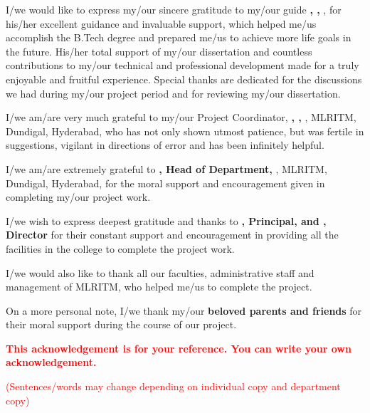 \begin{acknowledgment}
    I/we would like to express my/our sincere gratitude to my/our guide 
    \textbf{\guide, \guideDesignation, \deptName}, for his/her excellent guidance and invaluable support, which helped me/us accomplish the B.Tech degree and prepared me/us to achieve more life goals in the future. His/her total support of my/our dissertation and countless contributions to my/our technical and professional development made for a truly enjoyable and fruitful experience. Special thanks are dedicated for the discussions we had during my/our project period and for reviewing my/our dissertation.
    
    I/we am/are very much grateful to my/our Project Coordinator, 
    \textbf{\supervisor, \supervisorDesignation, \deptName}, MLRITM, Dundigal, Hyderabad, who has not only shown utmost patience, but was fertile in suggestions, vigilant in directions of error and has been infinitely helpful.
    
    I/we am/are extremely grateful to 
    \textbf{\hod, Head of Department, \deptName}, MLRITM, Dundigal, Hyderabad, for the moral support and encouragement given in completing my/our project work.
    
    I/we wish to express deepest gratitude and thanks to 
    \textbf{\principal, Principal, and \director, Director} for their constant support and encouragement in providing all the facilities in the college to complete the project work.
    
    I/we would also like to thank all our faculties, administrative staff and management of MLRITM, who helped me/us to complete the project.
    
    On a more personal note, I/we thank my/our \textbf{beloved parents and friends} for their moral support during the course of our project.
    
    \vspace{20pt}
    
    \textcolor{red}{\textbf{This acknowledgement is for your reference. You can write your own acknowledgement.}} 
    
    \textcolor{red}{(Sentences/words may change depending on individual copy and department copy)}   
\end{acknowledgment}
